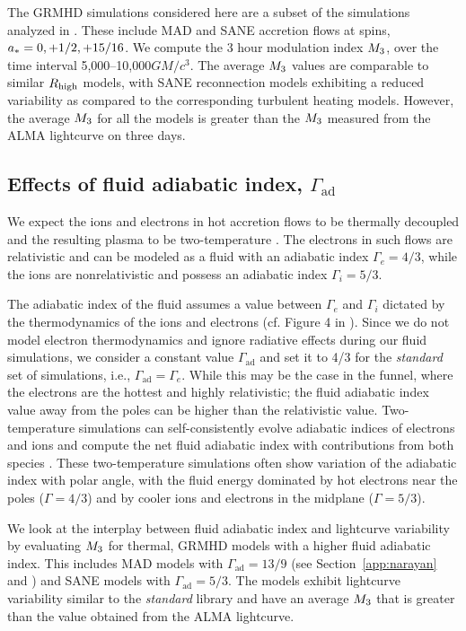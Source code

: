 The GRMHD simulations considered here are a subset of the simulations analyzed in \citealt{2020MNRAS.494.4168D}. These include MAD and SANE accretion flows at spins, $a_* = 0,+1/2,+15/16$. We compute the 3 hour modulation index $M_{3}$, over the time interval 5,000--10,000$GM/c^{3}$. The average $M_{3}$ values are comparable to similar $R_\mathrm{high}$ models, with SANE reconnection models exhibiting a reduced variability as compared to the corresponding turbulent heating models. However, the average $M_{3}$ for all the models is greater than the $M_{3}$ measured from the ALMA lightcurve on three days.

\subsection{Effects of fluid adiabatic index, \texorpdfstring{$\Gamma_\mathrm{ad}$}{Gad}}

We expect the ions and electrons in hot accretion flows to be thermally decoupled and the resulting plasma to be two-temperature \citep{1976ApJ...204..187S, Quataert_1998, 10.1093/mnras/stw3116, Ryan_2018, Chael2018}. The electrons in such flows are relativistic and can be modeled as a fluid with an adiabatic index $\Gamma_{e}=4/3$, while the ions are nonrelativistic and possess an adiabatic index $\Gamma_{i}=5/3$.

The adiabatic index of the fluid assumes a value between $\Gamma_{e}$ and $\Gamma_{i}$ dictated by the thermodynamics of the ions and electrons (cf. Figure 4 in \citealt{10.1093/mnras/stw3116}). Since we do not model electron thermodynamics and ignore radiative effects during our fluid simulations, we consider a constant value $\Gamma_\mathrm{ad}$ and set it to 4/3 for the \textit{standard} set of simulations, i.e., $\Gamma_\mathrm{ad}=\Gamma_{e}$. While this may be the case in the funnel, where the electrons are the hottest and highly relativistic; the fluid adiabatic index value away from the poles can be higher than the relativistic value.
Two-temperature simulations can self-consistently evolve adiabatic indices of electrons and ions and compute the net fluid adiabatic index with contributions from both species \cite{10.1093/mnras/stw3116}. These two-temperature simulations often show variation of the adiabatic index with polar angle, with the fluid energy dominated by hot electrons near the poles ($\Gamma = 4/3$) and by cooler ions and  electrons in the midplane ($\Gamma=5/3$).

We look at the interplay between fluid adiabatic index and lightcurve variability by evaluating $M_{3}$ for thermal, GRMHD models with a higher fluid adiabatic index. This includes MAD models with $\Gamma_\mathrm{ad}=13/9$ (see Section~\ref{app:narayan} and  \citealt{2021arXiv210812380N}) and SANE models with $\Gamma_\mathrm{ad}=5/3$. The models exhibit lightcurve variability similar to the \textit{standard} library and have an average $M_{3}$ that is greater than the value obtained from the ALMA lightcurve.
